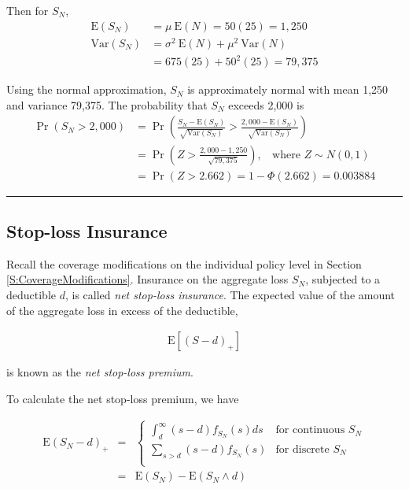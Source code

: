 \documentclass[]{book}
\theoremstyle{definition}
\theoremstyle{definition}
\theoremstyle{definition}
\theoremstyle{remark}
\begin{document}
Then for \(S_N\), \[\begin{aligned}
\mathrm{E}(S_N) &= \mu \ \mathrm{E} (N) = 50(25) = 1,250\\
\mathrm{Var}(S_N) &= \sigma^2 \ \mathrm{E}(N) + \mu^2 \ \mathrm{Var}(N)\\
&= 675 (25) + 50^2 (25) = 79,375
\end{aligned}\]

Using the normal approximation, \(S_N\) is approximately normal with
mean 1,250 and variance 79,375. The probability that \(S_N\) exceeds
2,000 is \[\begin{aligned}
\Pr(S_N>2,000) &= \Pr \left(\frac{S_N - \mathrm{E} (S_N)}{\sqrt{\mathrm{Var} (S_N)}} > \frac{2,000- \mathrm{E} (S_N)}{\sqrt{\mathrm{Var} (S_N)}} \right) \\
&= \Pr\left( Z > \frac{2,000-1,250}{\sqrt{79,375}} \right), ~~~~ \text{where } Z\sim N(0,1) \\
&= \Pr (Z > 2.662) = 1-\Phi(2.662) = 0.003884
\end{aligned}\]

\begin{center}\rule{0.5\linewidth}{\linethickness}\end{center}

\subsection{Stop-loss Insurance}\label{stop-loss-insurance}

Recall the coverage modifications on the individual policy level in
Section \ref{S:CoverageModifications}. Insurance on the aggregate loss
\(S_N\), subjected to a deductible \(d\), is called
\textit{net stop-loss insurance}. The expected value of the amount of
the aggregate loss in excess of the deductible,

\begin{eqnarray*}
\mathrm{E}[(S-d)_+]
\end{eqnarray*}

is known as the \emph{net stop-loss premium}.

To calculate the net stop-loss premium, we have

\begin{eqnarray*}
\mathrm{E}(S_N-d)_+ 
&=&
\left\{\begin{array}{ll}
\int_{d}^{\infty}(s-d) f_{S_N}(s) ds& \text{for continuous } S_N\\
 \sum_{s>d}(s-d) f_{S_N}(s) & \text{for discrete } S_N\\
 \end{array}\right.\\
&=& \mathrm{E}(S_N) - \mathrm{E}(S_N\wedge d)\\
\end{eqnarray*}
\end{document}
